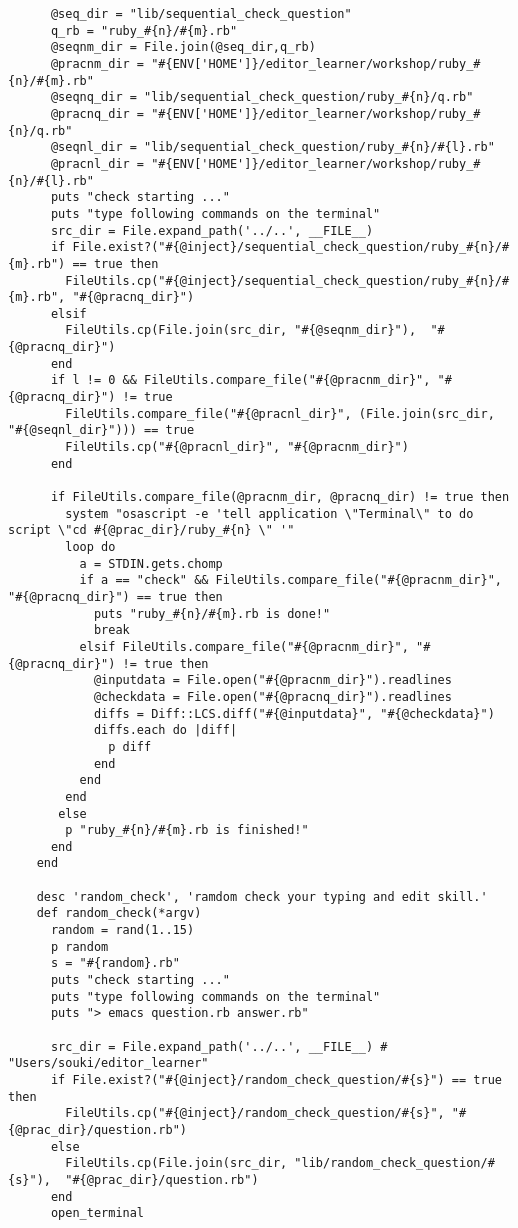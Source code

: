 \begin{verbatim}
      @seq_dir = "lib/sequential_check_question"
      q_rb = "ruby_#{n}/#{m}.rb"
      @seqnm_dir = File.join(@seq_dir,q_rb)
      @pracnm_dir = "#{ENV['HOME']}/editor_learner/workshop/ruby_#{n}/#{m}.rb"
      @seqnq_dir = "lib/sequential_check_question/ruby_#{n}/q.rb"
      @pracnq_dir = "#{ENV['HOME']}/editor_learner/workshop/ruby_#{n}/q.rb"      
      @seqnl_dir = "lib/sequential_check_question/ruby_#{n}/#{l}.rb"
      @pracnl_dir = "#{ENV['HOME']}/editor_learner/workshop/ruby_#{n}/#{l}.rb"      
      puts "check starting ..."
      puts "type following commands on the terminal"
      src_dir = File.expand_path('../..', __FILE__)
      if File.exist?("#{@inject}/sequential_check_question/ruby_#{n}/#{m}.rb") == true then
        FileUtils.cp("#{@inject}/sequential_check_question/ruby_#{n}/#{m}.rb", "#{@pracnq_dir}")
      elsif
        FileUtils.cp(File.join(src_dir, "#{@seqnm_dir}"),  "#{@pracnq_dir}")
      end
      if l != 0 && FileUtils.compare_file("#{@pracnm_dir}", "#{@pracnq_dir}") != true
        FileUtils.compare_file("#{@pracnl_dir}", (File.join(src_dir, "#{@seqnl_dir}"))) == true
        FileUtils.cp("#{@pracnl_dir}", "#{@pracnm_dir}")
      end
      
      if FileUtils.compare_file(@pracnm_dir, @pracnq_dir) != true then
        system "osascript -e 'tell application \"Terminal\" to do script \"cd #{@prac_dir}/ruby_#{n} \" '"
        loop do
          a = STDIN.gets.chomp
          if a == "check" && FileUtils.compare_file("#{@pracnm_dir}", "#{@pracnq_dir}") == true then
            puts "ruby_#{n}/#{m}.rb is done!"
            break
          elsif FileUtils.compare_file("#{@pracnm_dir}", "#{@pracnq_dir}") != true then
            @inputdata = File.open("#{@pracnm_dir}").readlines
            @checkdata = File.open("#{@pracnq_dir}").readlines
            diffs = Diff::LCS.diff("#{@inputdata}", "#{@checkdata}")
            diffs.each do |diff|
              p diff
            end
          end
        end
       else
        p "ruby_#{n}/#{m}.rb is finished!"
      end
    end

    desc 'random_check', 'ramdom check your typing and edit skill.'
    def random_check(*argv)
      random = rand(1..15)
      p random
      s = "#{random}.rb"
      puts "check starting ..."
      puts "type following commands on the terminal"
      puts "> emacs question.rb answer.rb"

      src_dir = File.expand_path('../..', __FILE__) # "Users/souki/editor_learner"
      if File.exist?("#{@inject}/random_check_question/#{s}") == true then
        FileUtils.cp("#{@inject}/random_check_question/#{s}", "#{@prac_dir}/question.rb")
      else
        FileUtils.cp(File.join(src_dir, "lib/random_check_question/#{s}"),  "#{@prac_dir}/question.rb")
      end
      open_terminal
      

\end{verbatim}
